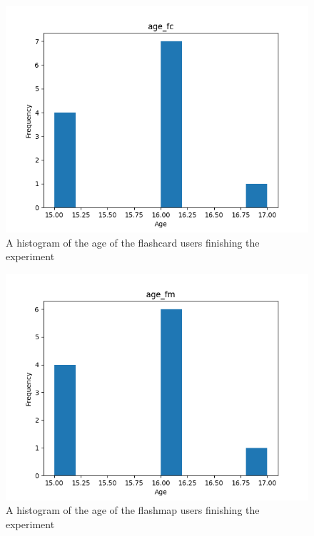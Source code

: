 \begin{figure}[htbp]
    \centering
    \includegraphics{img/age_fc.png}
    \caption{A histogram of the age of the flashcard users finishing the experiment}
\end{figure}
\begin{figure}[htbp]
    \centering
    \includegraphics{img/age_fm.png}
    \caption{A histogram of the age of the flashmap users finishing the experiment}
\end{figure}
